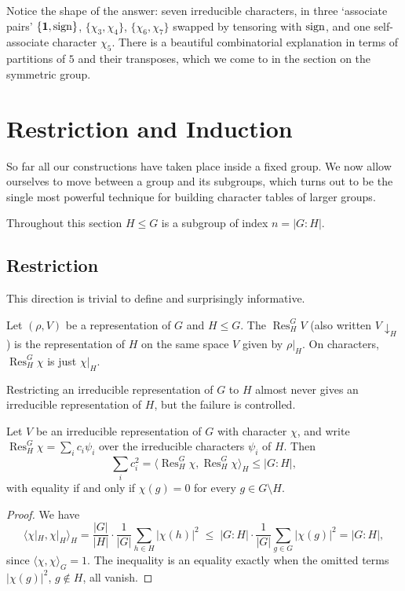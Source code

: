 \documentclass[a4paper]{scrartcl}
\newcommand{\Res}{\operatorname{Res}}
\newcommand{\ip}[2]{\langle #1, #2 \rangle}
\begin{document}
\begin{remark}
	Notice the shape of the answer: seven irreducible characters, in three `associate pairs' $\{\mathbf1,\operatorname{sign}\}$, $\{\chi_3,\chi_4\}$, $\{\chi_6,\chi_7\}$ swapped by tensoring with $\operatorname{sign}$, and one self-associate character $\chi_5$. There is a beautiful combinatorial explanation in terms of partitions of $5$ and their transposes, which we come to in the section on the symmetric group.
\end{remark}

\section{Restriction and Induction}

So far all our constructions have taken place inside a fixed group. We now allow ourselves to move between a group and its subgroups, which turns out to be the single most powerful technique for building character tables of larger groups.

Throughout this section $H \leq G$ is a subgroup of index $n = |G:H|$.

\subsection{Restriction}

This direction is trivial to define and surprisingly informative.

\begin{definition}[Restriction]
	Let $(\rho, V)$ be a representation of $G$ and $H\leq G$. The  $\Res^G_H V$ (also written $V\!\downarrow_H$) is the representation of $H$ on the same space $V$ given by $\rho|_H$. On characters, $\Res^G_H\chi$ is just $\chi|_H$.
\end{definition}

Restricting an irreducible representation of $G$ to $H$ almost never gives an irreducible representation of $H$, but the failure is controlled.

\begin{proposition}
	Let $V$ be an irreducible representation of $G$ with character $\chi$, and write $\Res^G_H\chi = \sum_i c_i\psi_i$ over the irreducible characters $\psi_i$ of $H$. Then
	$$\sum_i c_i^2 = \ip{\Res^G_H\chi}{\Res^G_H\chi}_H \leq |G:H|,$$
	with equality if and only if $\chi(g) = 0$ for every $g \in G\setminus H$.
\end{proposition}
\begin{proof}
	We have
	$$\ip{\chi|_H}{\chi|_H}_H = \frac{|G|}{|H|}\cdot\frac1{|G|}\sum_{h\in H}|\chi(h)|^2 \; \leq \; |G:H|\cdot\frac1{|G|}\sum_{g\in G}|\chi(g)|^2 = |G:H|,$$
	since $\ip\chi\chi_G = 1$. The inequality is an equality exactly when the omitted terms $|\chi(g)|^2$, $g\notin H$, all vanish.
\end{proof}
\end{document}
